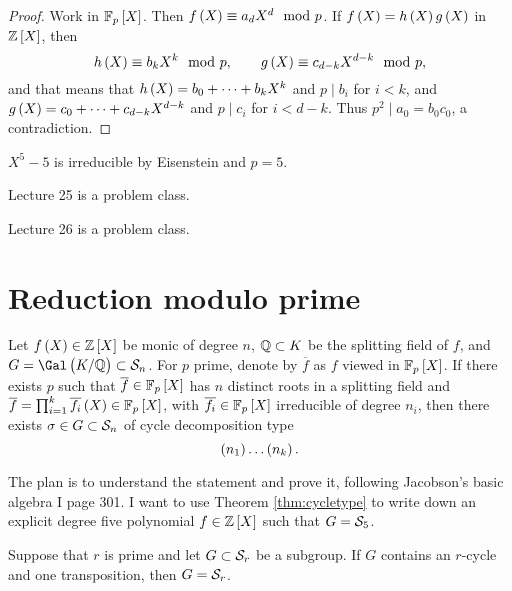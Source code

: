 \begin{proof}
Work in $ \FF_p\sbr{X} $. Then $ f\br{X} \equiv a_dX^d \mod p $. If $ f\br{X} = h\br{X}g\br{X} $ in $ \ZZ\sbr{X} $, then
$$ h\br{X} \equiv b_kX^k \mod p, \qquad g\br{X} \equiv c_{d - k}X^{d - k} \mod p, $$
and that means that $ h\br{X} = b_0 + \dots + b_kX^k $ and $ p \mid b_i $ for $ i < k $, and $ g\br{X} = c_0 + \dots + c_{d - k}X^{d - k} $ and $ p \mid c_i $ for $ i < d - k $. Thus $ p^2 \mid a_0 = b_0c_0 $, a contradiction.
\end{proof}

\begin{example*}
$ X^5 - 5 $ is irreducible by Eisenstein and $ p = 5 $.
\end{example*}


Lecture 25 is a problem class.


Lecture 26 is a problem class.

\pagebreak

\section{Reduction modulo prime}


\begin{theorem}
\label{thm:cycletype}
Let $ f\br{X} \in \ZZ\sbr{X} $ be monic of degree $ n $, $ \mathbb{Q} \subset K $ be the splitting field of $ f $, and $ G = \Gal\br{K / \QQ} \subset \SSS_n $. For $ p $ prime, denote by $ \overline{f} $ as $ f $ viewed in $ \FF_p\sbr{X} $. If there exists $ p $ such that $ \overline{f} \in \FF_p\sbr{X} $ has $ n $ distinct roots in a splitting field and $ \overline{f} = \prod_{i = 1}^k \overline{f_i}\br{X} \in \FF_p\sbr{X} $, with $ \overline{f_i} \in \FF_p\sbr{X} $ irreducible of degree $ n_i $, then there exists $ \sigma \in G \subset \mathcal{S}_n $ of cycle decomposition type
$$ \br{n_1} \dots \br{n_k}. $$
\end{theorem}

The plan is to understand the statement and prove it, following Jacobson's basic algebra I page 301. I want to use Theorem \ref{thm:cycletype} to write down an explicit degree five polynomial $ f \in \ZZ\sbr{X} $ such that $ G = \mathcal{S}_5 $.

\begin{proposition}
Suppose that $ r $ is prime and let $ G \subset \mathcal{S}_r $ be a subgroup. If $ G $ contains an $ r $-cycle and one transposition, then $ G = \mathcal{S}_r $.
\end{proposition}

